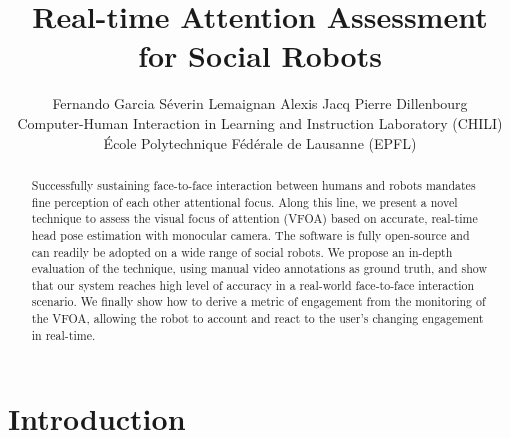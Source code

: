\documentclass{sig-alternate}
\begin{document}
%

\title{Real-time Attention Assessment for Social Robots}
\author{Fernando Garcia \qquad Séverin Lemaignan \qquad Alexis Jacq \qquad Pierre Dillenbourg\\Computer-Human Interaction in Learning and Instruction Laboratory (CHILI)\\École Polytechnique Fédérale de Lausanne (EPFL)}


\maketitle
\begin{abstract}
Successfully sustaining face-to-face interaction between humans and robots mandates fine perception of each other attentional focus. Along this line, we present a novel technique to assess the visual focus of attention (VFOA) based on accurate, real-time head pose estimation with monocular camera. The software is fully open-source and can readily be adopted on a wide range of social robots. We propose an in-depth evaluation of the technique, using manual video annotations as ground truth, and show that our system reaches high level of accuracy in a real-world face-to-face interaction scenario. We finally show how to derive a metric of engagement from the monitoring of the VFOA, allowing the robot to account and react to the user's changing engagement in real-time.
\end{abstract}




\section{Introduction}
\end{document}

